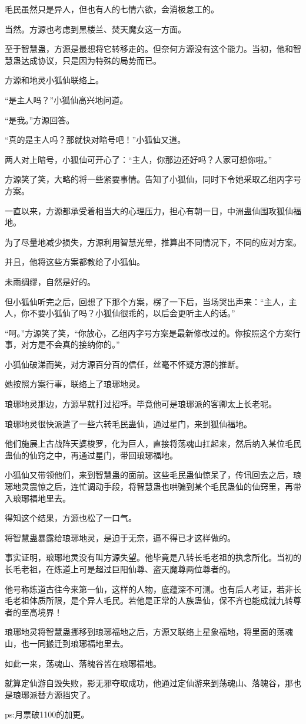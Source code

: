 \begin{this_body}
毛民虽然只是异人，但也有人的七情六欲，会消极怠工的。

当然。方源也考虑到黑楼兰、焚天魔女这一方面。

至于智慧蛊，方源是最想将它转移走的。但奈何方源没有这个能力。当初，他和智慧蛊达成协议，只是因为特殊的局势而已。

方源和地灵小狐仙联络上。

“是主人吗？”小狐仙高兴地问道。

“是我。”方源回答。

“真的是主人吗？那就快对暗号吧！”小狐仙又道。

两人对上暗号，小狐仙可开心了：“主人，你那边还好吗？人家可想你啦。”

方源笑了笑，大略的将一些紧要事情。告知了小狐仙，同时下令她采取乙组丙字号方案。

一直以来，方源都承受着相当大的心理压力，担心有朝一日，中洲蛊仙围攻狐仙福地。

为了尽量地减少损失，方源利用智慧光晕，推算出不同情况下，不同的应对方案。

并且，他将这些方案都教给了小狐仙。

未雨绸缪，自然是好的。

但小狐仙听完之后，回想了下那个方案，楞了一下后，当场哭出声来：“主人，主人，你不要小狐仙了吗？小狐仙很乖的，以后会更听主人的话。”

“呵。”方源笑了笑，“你放心，乙组丙字号方案是最新修改过的。你按照这个方案行事，对方是不会真的接纳你的。”

小狐仙破涕而笑，对方源百分百的信任，丝毫不怀疑方源的推断。

她按照方案行事，联络上了琅琊地灵。

琅琊地灵那边，方源早就打过招呼。毕竟他可是琅琊派的客卿太上长老呢。

琅琊地灵很快派遣了一些六转毛民蛊仙，通过星门，来到狐仙福地。

他们施展上古战阵天婆梭罗，化为巨人，直接将荡魂山扛起来，然后纳入某位毛民蛊仙的仙窍之中，再通过星门，带回琅琊福地。

小狐仙又带领他们，来到智慧蛊的面前。这些毛民蛊仙惊呆了，传讯回去之后，琅琊地灵震惊之后，连忙调动手段，将智慧蛊也哄骗到某个毛民蛊仙的仙窍里，再带入琅琊福地里去。

得知这个结果，方源也松了一口气。

将智慧蛊暴露给琅琊地灵，是迫于无奈，逼不得已才这样做的。

事实证明，琅琊地灵没有叫方源失望。他毕竟是八转长毛老祖的执念所化。当初的长毛老祖，在炼道上可是超过巨阳仙尊、盗天魔尊两位尊者的。

他号称炼道古往今来第一仙，这样的人物，底蕴深不可测。也有后人考证，若非长毛老祖体质所限，是个异人毛民。若他是正常的人族蛊仙，保不齐也能成就九转尊者的至高境界！

琅琊地灵将智慧蛊挪移到琅琊福地之后，方源又联络上星象福地，将里面的荡魂山，也一同搬迁到琅琊福地里去。

如此一来，荡魂山、落魄谷皆在琅琊福地。

就算定仙游自毁失败，影无邪夺取成功，他通过定仙游来到荡魂山、落魄谷，那也是琅琊派替方源挡灾了。

ps:月票破1100的加更。

\end{this_body}


